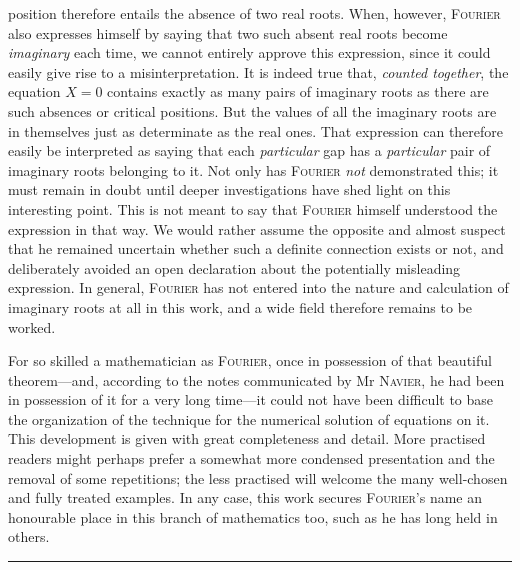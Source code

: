 position therefore entails the absence of two real roots. When, however, \textsc{Fourier} also expresses himself by saying that two such absent real roots become \textit{imaginary} each time, we cannot entirely approve this expression, since it could easily give rise to a misinterpretation. It is indeed true that, \textit{counted together}, the equation $X=0$ contains exactly as many pairs of imaginary roots as there are such absences or critical positions. But the values of all the imaginary roots are in themselves just as determinate as the real ones. That expression can therefore easily be interpreted as saying that each \textit{particular} gap has a \textit{particular} pair of imaginary roots belonging to it. Not only has \textsc{Fourier} \textit{not} demonstrated this; it must remain in doubt until deeper investigations have shed light on this interesting point. This is not meant to say that \textsc{Fourier} himself understood the expression in that way. We would rather assume the opposite and almost suspect that he remained uncertain whether such a definite connection exists or not, and deliberately avoided an open declaration about the potentially misleading expression. In general, \textsc{Fourier} has not entered into the nature and calculation of imaginary roots at all in this work, and a wide field therefore remains to be worked.\par
For so skilled a mathematician as \textsc{Fourier}, once in possession of that beautiful theorem---and, according to the notes communicated by Mr \textsc{Navier}, he had been in possession of it for a very long time---it could not have been difficult to base the organization of the technique for the numerical solution of equations on it. This development is given with great completeness and detail. More practised readers might perhaps prefer a somewhat more condensed presentation and the removal of some repetitions; the less practised will welcome the many well-chosen and fully treated examples. In any case, this work secures \textsc{Fourier}'s name an honourable place in this branch of mathematics too, such as he has long held in others.\par
\par\noindent\hfill\rule{0.30\linewidth}{0.4pt}\hfill\mbox{}\par
